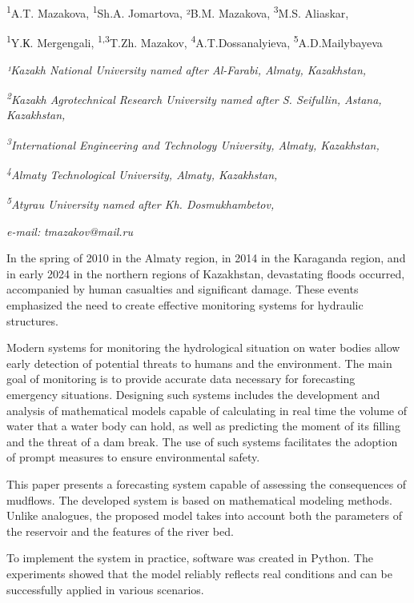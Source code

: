 {\textsuperscript{1}A.T. Mazakova, \textsuperscript{1}Sh.A. Jomartova,
²B.M. Mazakova, \textsuperscript{3}M.S. Aliaskar,

\textsuperscript{1}Y.К. Mergengali, \textsuperscript{1,3}T.Zh. Mazakov,
\textsuperscript{4}A.T.Dossanalyieva, \textsuperscript{5}A.D.Mailybayeva

\emph{¹Kazakh National University named after Al-Farabi, Almaty,
Kazakhstan,}

\emph{\textsuperscript{2}Kazakh Agrotechnical Research University named
after S. Seifullin, Astana, Kazakhstan,}

\emph{\textsuperscript{3}International Engineering and Technology
University, Almaty, Kazakhstan,}

\emph{\textsuperscript{4}Almaty Technological University, Almaty,
Kazakhstan,}

\emph{\textsuperscript{5}Atyrau University named after Kh.
Dosmukhambetov,}

\emph{e-mail:} \emph{tmazakov@mail.ru}

In the spring of 2010 in the Almaty region, in 2014 in the Karaganda
region, and in early 2024 in the northern regions of Kazakhstan,
devastating floods occurred, accompanied by human casualties and
significant damage. These events emphasized the need to create effective
monitoring systems for hydraulic structures.

Modern systems for monitoring the hydrological situation on water bodies
allow early detection of potential threats to humans and the
environment. The main goal of monitoring is to provide accurate data
necessary for forecasting emergency situations. Designing such systems
includes the development and analysis of mathematical models capable of
calculating in real time the volume of water that a water body can hold,
as well as predicting the moment of its filling and the threat of a dam
break. The use of such systems facilitates the adoption of prompt
measures to ensure environmental safety.

This paper presents a forecasting system capable of assessing the
consequences of mudflows. The developed system is based on mathematical
modeling methods. Unlike analogues, the proposed model takes into
account both the parameters of the reservoir and the features of the
river bed.

To implement the system in practice, software was created in Python. The
experiments showed that the model reliably reflects real conditions and
can be successfully applied in various scenarios.

}
